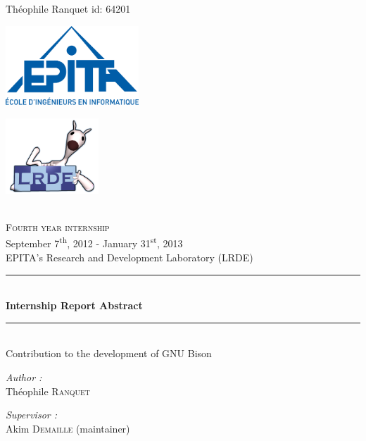 \documentclass[a4paper,11pt,final]{article}
\newcommand{\reporttitle}{Internship Report Abstract}
\newcommand{\reportauthor}{Théophile \textsc{Ranquet}}
\newcommand{\reportsubject}{Fourth year internship}
\newcommand{\HRule}{\rule{\linewidth}{0.5mm}}
\newcommand{\ts}{\textsuperscript}
\begin{document}
Théophile Ranquet
  id: 64201
\begin{center}
  \begin{minipage}[t]{0.48\textwidth}
    \begin{flushleft}
      \includegraphics [width=50mm]{images/logo-epita.png} \\[0.5cm]
      \begin{spacing}{1.5}
      \end{spacing}
    \end{flushleft}
  \end{minipage}
  \begin{minipage}[t]{0.48\textwidth}
    \begin{flushright}
      \includegraphics [width=35mm]{images/logo-lrde.png} \\[0.5cm]
    \end{flushright}
  \end{minipage} \\[0.5cm]

    \textsc{\Large \reportsubject}\\[0.5cm]
    \large{September 7\ts{th}, 2012 - January 31\ts{st}, 2013}\\[0.1cm]
    \large{EPITA's Research and Development Laboratory (LRDE)}\\[0.3cm]
    \HRule \\[0.4cm]
    {\huge \bfseries \reporttitle}\\[00.4cm]
    \HRule \\[0.2cm]

    \large{Contribution to the development of GNU Bison}\\[0.2cm]

    \begin{minipage}[t]{0.3\textwidth}
      \begin{flushleft} \large
        \emph{Author :}\\
        \reportauthor\\
      \end{flushleft}
    \end{minipage}
    \begin{minipage}[t]{0.6\textwidth}
      \begin{flushright} \large
        \emph{Supervisor :} \\
        Akim \textsc{Demaille} (maintainer)\\
      \end{flushright}
    \end{minipage}
  \end{center}
\end{document}
